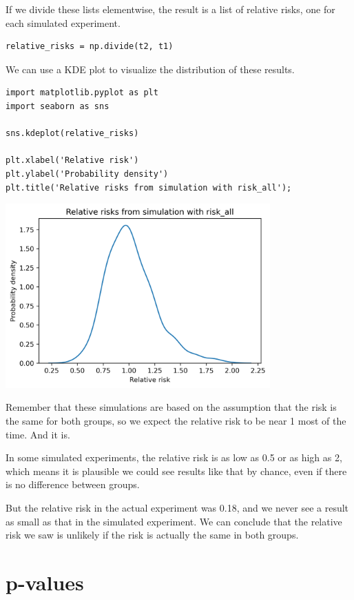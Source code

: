 If we divide these lists elementwise, the result is a list of relative
risks, one for each simulated experiment.

\begin{lstlisting}[]
relative_risks = np.divide(t2, t1)
\end{lstlisting}

We can use a KDE plot to visualize the distribution of these results.

\begin{lstlisting}[]
import matplotlib.pyplot as plt
import seaborn as sns

sns.kdeplot(relative_risks)

plt.xlabel('Relative risk')
plt.ylabel('Probability density')
plt.title('Relative risks from simulation with risk_all');
\end{lstlisting}

\begin{center}
\includegraphics[width=4in]{chapters/13_hypothesis_files/13_hypothesis_28_0.png}
\end{center}

Remember that these simulations are based on the assumption that the
risk is the same for both groups, so we expect the relative risk to be
near 1 most of the time. And it is.

In some simulated experiments, the relative risk is as low as 0.5 or as
high as 2, which means it is plausible we could see results like that by
chance, even if there is no difference between groups.

But the relative risk in the actual experiment was 0.18, and we never
see a result as small as that in the simulated experiment. We can
conclude that the relative risk we saw is unlikely if the risk is
actually the same in both groups.

\hypertarget{p-values}{%
\section{p-values}\label{p-values}}

